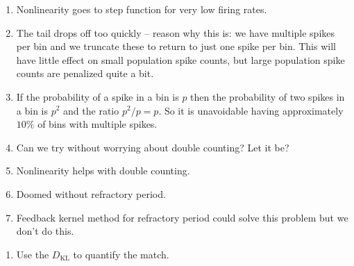 \documentclass[11pt]{article}
\begin{document}
\begin{enumerate}
\item Nonlinearity goes to step function for very low firing rates.
\item The tail drops off too quickly -- reason why this is: we have multiple spikes per bin and we truncate these to return to just one spike per bin. This will have little effect on small population spike counts, but large population spike counts are penalized quite a bit.
\item If the probability of a spike in a bin is $p$ then the probability of two spikes in a bin is $p^2$ and the ratio $p^2/p = p$. So it is unavoidable having approximately $10\%$ of bins with multiple spikes.
\item Can we try without worrying about double counting? Let it be?
\item Nonlinearity helps with double counting.
\item Doomed without refractory period.
\item Feedback kernel method for refractory period could solve this problem but we don't do this.
\end{enumerate}

\begin{enumerate}
\item Use the $D_{\text{KL}}$ to quantify the match.
\end{enumerate}


{}  %
\end{document}
